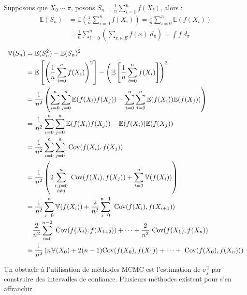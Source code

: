\begin{remark}
    Supposons que $X_0 \sim \pi$, posons $ S_n = \frac{1}{n} \sum_{i=1}^{n} f(X_i)$, alors : 
    \begin{align*}
        \mathbb{E}(S_n) &= \mathbb{E} \left( \frac{1}{n} \sum_{i=0}^{n} f(X_i) \right) 
        = \frac{1}{n} \sum_{i=0}^{n} \mathbb{E}(f(X_i)) \\
        &= \frac{1}{n} \sum_{i=0}^{n} \left( \sum_{x \in E} f(x) \; d_\pi \right)
        = \int f \; d_\pi 
    \end{align*}

    \begin{align*}
        \mathbb{V}(S_n) &= \mathbb{E}(S_n^2) - \mathbb{E}(S_n)^2 \\ 
        &= \mathbb{E} \left[ \left( \frac{1}{n} \sum_{i=0}^{n} f(X_i) \right)^2 \right] - \left( \mathbb{E} \left[ \frac{1}{n} \sum_{i=0}^{n} f(X_i) \right]  \right)^2 \\
        &= \frac{1}{n^2} \left( \sum_{i=0}^{n} \sum_{j=0}^{n} \mathbb{E}(f(X_i)f(X_j)) -  \sum_{i=0}^{n} \sum_{j=0}^{n} \mathbb{E}(f(X_i)) \mathbb{E}(f(X_j))   \right) \\ 
        &= \frac{1}{n^2}  \sum_{i=0}^{n} \sum_{j=0}^{n} \mathbb{E}(f(X_i)f(X_j)) - \mathbb{E}(f(X_i)) \mathbb{E}(f(X_j)) \\ 
        &= \frac{1}{n^2}  \sum_{i=0}^{n} \sum_{j=0}^{n} \text{ Cov}(f(X_i), f(X_j))  \\
        &= \frac{1}{n^2} \left( 2 \sum_{\substack{i,j=0 \\ i \not = j}}^{n} \text{ Cov}(f(X_i), f(X_j)) + \sum_{i=0}^{n} \mathbb{V}(f(X_i))\right) \\ 
        &= \frac{1}{n^2} \sum_{i=0}^{n} \mathbb{V}(f(X_i)) + \frac{2}{n^2}\sum_{i=0}^{n-1} \text{ Cov}(f(X_i), f(X_{i+1})) \\ 
        & \quad \frac{2}{n^2} \sum_{i=0}^{n-2} \text{ Cov}(f(X_i), f(X_{i+2})) + \dots + \frac{2}{n^2}\text{ Cov}(f(X_1), f(X_n)) \\
        &= \frac{1}{n^2} \left( n \mathbb{V}(X_0) + 2(n-1) \text{Cov}(f(X_0), f(X_1)) + \dots + \text{ Cov}(f(X_0), f(X_n)) \right)
    \end{align*}

    Un obstacle à l'utilisation de méthodes MCMC est l'estimation de $ \sigma_f^2$ par construire des intervalles de 
    confiance. Plusieurs méthodes existent pour s'en affranchir. 
\end{remark}


